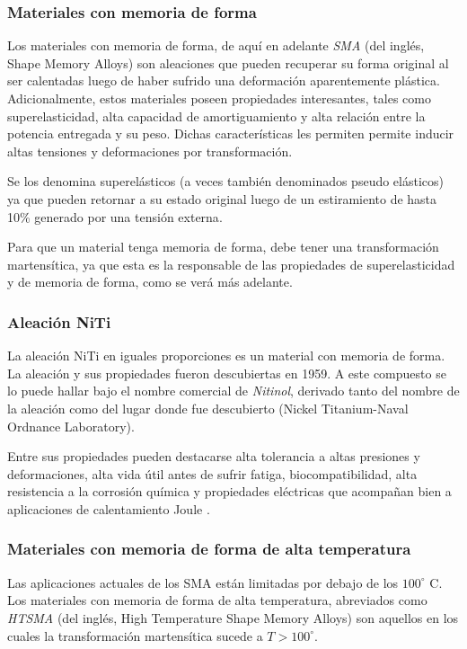 \documentclass[12pt]{article}
\theoremstyle{definition}
\theoremstyle{remark}
\begin{document}
\subsubsection{Materiales con memoria de forma}

Los materiales con memoria de forma, de aquí en adelante \textit{SMA} (del inglés, Shape Memory Alloys) son aleaciones que pueden recuperar su forma original al ser calentadas luego de haber sufrido una deformación aparentemente plástica. Adicionalmente, estos materiales poseen propiedades interesantes, tales como superelasticidad, alta capacidad de amortiguamiento y alta relación entre la potencia entregada y su peso. Dichas características les permiten permite inducir altas tensiones y deformaciones por transformación.

Se los denomina superelásticos (a veces también denominados pseudo elásticos) ya que pueden retornar a su estado original luego de un estiramiento de hasta 10\% generado por una tensión externa\cite{Rubber}.

Para que un material tenga memoria de forma, debe tener una transformación martensítica, ya que esta es la responsable de las propiedades de superelasticidad y de memoria de forma, como se verá más adelante.

\subsubsection{Aleación NiTi}\label{aleation}
La aleación NiTi en iguales proporciones es un material con memoria de forma. La aleación y sus propiedades fueron descubiertas en 1959. A este compuesto se lo puede hallar bajo el nombre comercial de \textit{Nitinol}, derivado tanto del nombre de la aleación como del lugar donde fue descubierto (Nickel Titanium-Naval Ordnance Laboratory)\cite{Story}. 

Entre sus propiedades pueden destacarse alta tolerancia a altas presiones y deformaciones, alta vida útil antes de sufrir fatiga, biocompatibilidad, alta resistencia a la corrosión química y propiedades eléctricas que acompañan bien a aplicaciones de calentamiento Joule \cite{ThinFilm}.

\subsubsection{Materiales con memoria de forma de alta temperatura}

Las aplicaciones actuales de los SMA están limitadas por debajo de los $100^\circ$ C. Los materiales con memoria de forma de alta temperatura, abreviados como \textit{HTSMA} (del inglés, High Temperature Shape Memory Alloys) son aquellos en los cuales la transformación martensítica sucede a $T > 100^\circ$.
\end{document}
